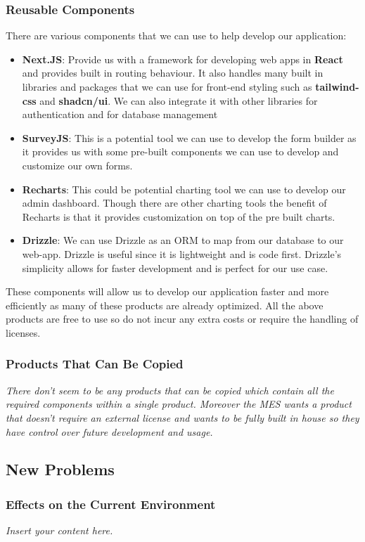 \documentclass[12pt]{article}
\newcommand{\lips}{\textit{Insert your content here.}}
\begin{document}
\subsubsection{Reusable Components}
There are various components that we can use to help develop our application:
\begin{itemize}
  \item \textbf{Next.JS}: Provide us with a framework for developing web apps in \textbf{React} and provides built in routing behaviour. It also handles many built in libraries and packages that we can use for front-end styling such as \textbf{tailwind-css} and \textbf{shadcn/ui}. We can also integrate it with other libraries for authentication and for database management
  \item \textbf{SurveyJS}: This is a potential tool we can use to develop the form builder as it provides us with some pre-built components we can use to develop and customize our own forms. 
  \item \textbf{Recharts}: This could be potential charting tool we can use to develop our admin dashboard. Though there are other charting tools the benefit of Recharts is that it provides customization on top of the pre built charts.
  \item \textbf{Drizzle}: We can use Drizzle as an ORM to map from our database to our web-app. Drizzle is useful since it is lightweight and is code first. Drizzle's simplicity allows for faster development and is perfect for our use case.
\end{itemize}
These components will allow us to develop our application faster and more efficiently as many of these products are already optimized. All the above products are free to use so do not incur any extra costs or require the handling of licenses.
\subsubsection{Products That Can Be Copied}
\textit{There don't seem to be any products that can be copied which contain all the required components within a single product. Moreover the MES wants a product that doesn't require an external license and wants to be fully built in house so they have control over future development and usage.}

\subsection{New Problems}
\subsubsection{Effects on the Current Environment}
\lips
\end{document}
